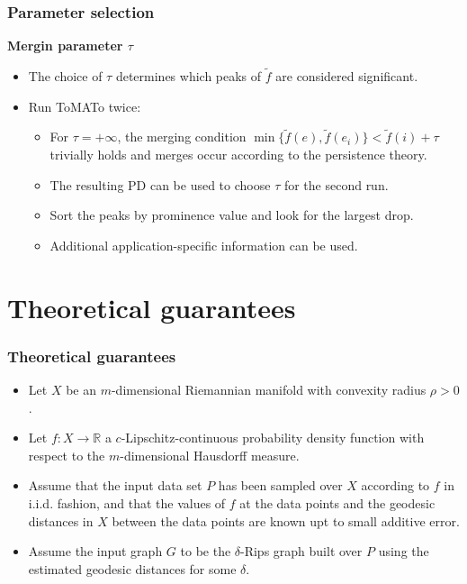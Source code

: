 \documentclass{beamer}
\theoremstyle{definition}
\newcommand{\R}{\mathbb{R}}
\begin{document}
\begin{frame}
\frametitle{Parameter selection}
\textbf{Mergin parameter $\tau$}
\begin{itemize}
\item<1-> The choice of $\tau$ determines which peaks of $\tilde{f}$ are considered significant. %
\item<2-> Run ToMATo twice: 
\begin{itemize}
\item<3-> For $\tau=+\infty$, the merging condition $\min\{\tilde{f}(e),\tilde{f}(e_i)\}<\tilde{f}(i)+\tau$ trivially holds and merges occur according to the persistence theory.
\item<4-> The resulting PD can be used to choose $\tau$ for the second run.
\item<5-> Sort the peaks by prominence value and look for the largest drop. %
\item<6-> Additional application-specific information can be used.
\end{itemize}
\end{itemize}
\end{frame}


\section{Theoretical guarantees}
\begin{frame}
\frametitle{Theoretical guarantees}
\begin{itemize}
\item<1-> Let $X$ be an $m$-dimensional Riemannian manifold with convexity radius $\rho>0$.
\item<2-> Let $f : X \to \R$ a $c$-Lipschitz-continuous probability density function with respect to the $m$-dimensional Hausdorff measure. 
\item<3-> Assume that the input data set $P$ has been sampled over $X$ according to $f$ in i.i.d. fashion, and that the values of $f$ at the data points and the geodesic distances in $X$ between the data points are known upt to small additive error. 
\item<4-> Assume the input graph $G$ to be the $\delta$-Rips graph built over $P$ using the estimated geodesic distances for some $\delta$.
\end{itemize}
\end{frame}
\end{document}
